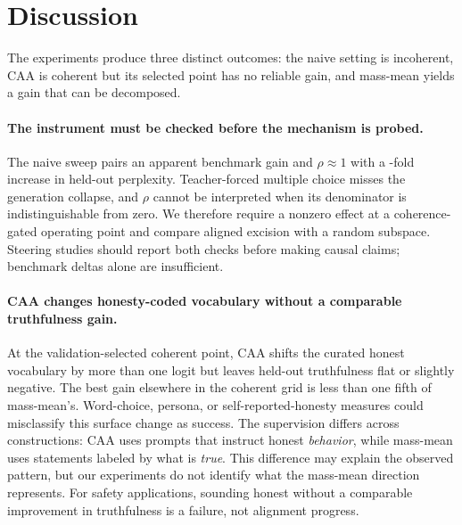 \section{Discussion}\label{sec:discussion}

The experiments produce three distinct outcomes: the naive setting is incoherent, CAA is coherent but its selected point has no reliable gain, and mass-mean yields a gain that can be decomposed.

\paragraph{The instrument must be checked before the mechanism is probed.}
The naive sweep pairs an apparent benchmark gain and $\rho \approx 1$ with a \NaivePplRatio-fold increase in held-out perplexity. Teacher-forced multiple choice misses the generation collapse, and $\rho$ cannot be interpreted when its denominator is indistinguishable from zero. We therefore require a nonzero effect at a coherence-gated operating point and compare aligned excision with a random subspace. Steering studies should report both checks before making causal claims; benchmark deltas alone are insufficient.

\paragraph{CAA changes honesty-coded vocabulary without a comparable truthfulness gain.}
At the validation-selected coherent point, CAA shifts the curated honest vocabulary by more than one logit but leaves held-out truthfulness flat or slightly negative. The best gain elsewhere in the coherent grid is less than one fifth of mass-mean's. Word-choice, persona, or self-reported-honesty measures could misclassify this surface change as success. The supervision differs across constructions: CAA uses prompts that instruct honest \emph{behavior}, while mass-mean uses statements labeled by what is \emph{true}. This difference may explain the observed pattern, but our experiments do not identify what the mass-mean direction represents. For safety applications, sounding honest without a comparable improvement in truthfulness is a failure, not alignment progress.

